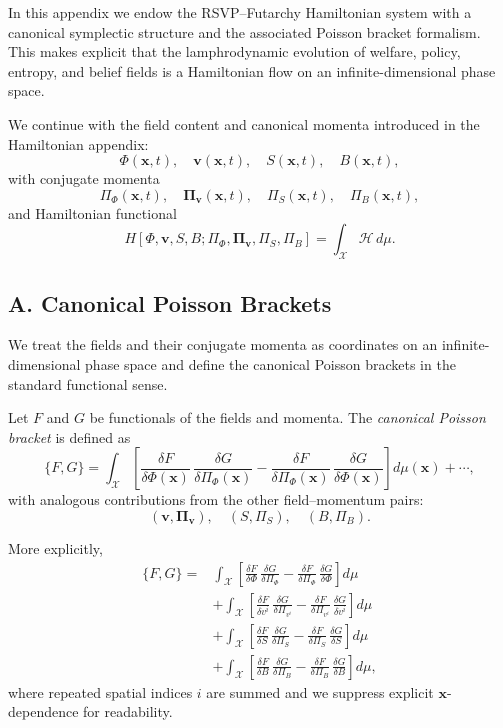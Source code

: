 \documentclass[12pt]{article}
\begin{document}
In this appendix we endow the RSVP--Futarchy Hamiltonian system with a
canonical symplectic structure and the associated Poisson bracket
formalism. This makes explicit that the lamphrodynamic evolution of
welfare, policy, entropy, and belief fields is a Hamiltonian flow on an
infinite-dimensional phase space.

We continue with the field content and canonical momenta introduced in
the Hamiltonian appendix:
\[
\Phi(\mathbf{x},t),\quad
\mathbf{v}(\mathbf{x},t),\quad
S(\mathbf{x},t),\quad
B(\mathbf{x},t),
\]
with conjugate momenta
\[
\Pi_\Phi(\mathbf{x},t),\quad
\bm{\Pi}_{\mathbf{v}}(\mathbf{x},t),\quad
\Pi_S(\mathbf{x},t),\quad
\Pi_B(\mathbf{x},t),
\]
and Hamiltonian functional
\[
H[\Phi,\mathbf{v},S,B;\Pi_\Phi,\bm{\Pi}_{\mathbf{v}},\Pi_S,\Pi_B]
=
\int_{\mathcal{X}} \mathcal{H} \, d\mu.
\]

\subsection*{A. Canonical Poisson Brackets}

We treat the fields and their conjugate momenta as coordinates on an
infinite-dimensional phase space and define the canonical Poisson
brackets in the standard functional sense.

Let $F$ and $G$ be functionals of the fields and momenta. The
\emph{canonical Poisson bracket} is defined as
\begin{equation}
\{F,G\}
=
\int_{\mathcal{X}}
\left[
    \frac{\delta F}{\delta \Phi(\mathbf{x})}
    \,\frac{\delta G}{\delta \Pi_\Phi(\mathbf{x})}
  - \frac{\delta F}{\delta \Pi_\Phi(\mathbf{x})}
    \,\frac{\delta G}{\delta \Phi(\mathbf{x})}
\right] d\mu(\mathbf{x})
+ \cdots,
\end{equation}
with analogous contributions from the other field--momentum pairs:
\[
(\mathbf{v},\bm{\Pi}_{\mathbf{v}}),\quad (S,\Pi_S),\quad (B,\Pi_B).
\]

More explicitly,
\begin{align}
\{F,G\}
=&
\int_{\mathcal{X}}
\left[
    \frac{\delta F}{\delta \Phi}
    \,\frac{\delta G}{\delta \Pi_\Phi}
  - \frac{\delta F}{\delta \Pi_\Phi}
    \,\frac{\delta G}{\delta \Phi}
\right] d\mu
\\[4pt]
&+
\int_{\mathcal{X}}
\left[
    \frac{\delta F}{\delta v^i}
    \,\frac{\delta G}{\delta \Pi_{v^i}}
  - \frac{\delta F}{\delta \Pi_{v^i}}
    \,\frac{\delta G}{\delta v^i}
\right] d\mu
\\[4pt]
&+
\int_{\mathcal{X}}
\left[
    \frac{\delta F}{\delta S}
    \,\frac{\delta G}{\delta \Pi_S}
  - \frac{\delta F}{\delta \Pi_S}
    \,\frac{\delta G}{\delta S}
\right] d\mu
\\[4pt]
&+
\int_{\mathcal{X}}
\left[
    \frac{\delta F}{\delta B}
    \,\frac{\delta G}{\delta \Pi_B}
  - \frac{\delta F}{\delta \Pi_B}
    \,\frac{\delta G}{\delta B}
\right] d\mu,
\end{align}
where repeated spatial indices $i$ are summed and we suppress explicit
$\mathbf{x}$-dependence for readability.
\end{document}
